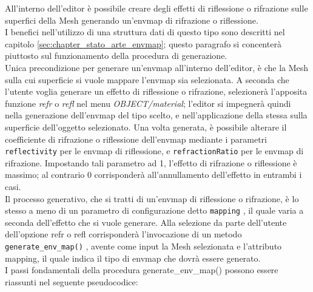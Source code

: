 All’interno dell’editor è possibile creare degli effetti di riflessione o rifrazione sulle superfici della Mesh generando un’envmap di rifrazione o riflessione.
\\
I benefici nell’utilizzo di una struttura dati di questo tipo sono descritti nel capitolo \ref{sec:chapter_stato_arte_envmap}; questo paragrafo si concenterà piuttosto sul funzionamento della procedura di generazione. 
\\
Unica precondizione per generare un’envmap all’interno dell’editor, è che la Mesh sulla cui superficie si vuole mappare l’envmap sia selezionata. A seconda che l’utente voglia generare un effetto di riflessione o rifrazione, selezionerà l’apposita funzione \emph{refr} o \emph{refl} nel menu \emph{OBJECT/material}; l’editor si impegnerà quindi nella generazione dell’envmap del tipo scelto, e nell’applicazione della stessa sulla superficie dell’oggetto selezionato. Una volta generata, è possibile alterare il coefficiente di rifrazione o riflessione dell’envmap mediante i parametri \texttt{reflectivity} per le envmap di riflessione, e \texttt{refractionRatio} per le envmap di rifrazione. Impostando tali parametro ad 1, l’effetto di rifrazione o riflessione è massimo; al contrario 0 corrisponderà all’annullamento dell’effetto in entrambi i casi.
\\
Il processo generativo, che si tratti di un’envmap di riflessione o rifrazione, è lo stesso a meno di un parametro di configurazione detto \texttt{mapping} , il quale varia a seconda dell’effetto che si vuole generare. Alla selezione da parte dell’utente dell'opzione refr o refl corrisponderà l’invocazione di un metodo \texttt{generate\_env\_map()} , avente come input la Mesh selezionata e l’attributo mapping, il quale indica il tipo di envmap che dovrà essere generato.
\\
I passi fondamentali della procedura generate\_env\_map() possono essere riassunti nel seguente pseudocodice:
\\
\\
